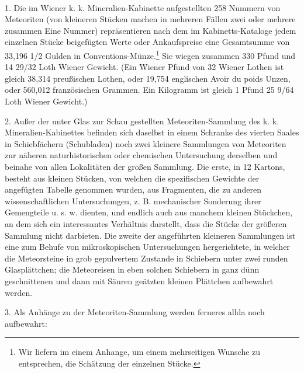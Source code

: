 \documentclass[a4paper, 11pt, oneside, polutonikogreek, german]{article}
\begin{document}
\paragraph{}
1. Die im Wiener k. k. Mineralien-Kabinette aufgestellten 258 Nummern von Meteoriten (von kleineren Stücken machen in mehreren Fällen zwei oder mehrere zusammen Eine Nummer) repräsentieren nach dem im Kabinetts-Kataloge jedem einzelnen Stücke beigefügten Werte oder Ankaufspreise eine Gesamtsumme von 33,196 1/2 Gulden in Conventions-Münze.\footnote{Wir liefern im einem Anhange, um einem mehrseitigen Wunsche zu entsprechen, die Schätzung der einzelnen Stücke.} Sie wiegen zusammen 330 Pfund und 14 29/32 Loth Wiener Gewicht. (Ein Wiener Pfund von 32 Wiener Lothen ist gleich 38,314 preußischen Lothen, oder 19,754 englischen Avoir du poids Unzen, oder 560,012 französischen Grammen. Ein Kilogramm ist gleich 1 Pfund 25 9/64 Loth Wiener Gewicht.)

2. Außer der unter Glas zur Schau gestellten Meteoriten-Sammlung des k. k. Mineralien-Kabinettes befinden sich daselbst in einem Schranke des vierten Saales in Schiebfächern (Schubladen) noch zwei kleinere Sammlungen von Meteoriten zur näheren naturhistorischen oder chemischen Untersuchung derselben und beinahe von allen Lokalitäten der großen Sammlung. Die erste, in 12 Kartons, besteht aus kleinen Stücken, von welchen die spezifischen Gewichte der angefügten Tabelle genommen wurden, aus Fragmenten, die zu anderen wissenschaftlichen Untersuchungen, z. B. mechanischer Sonderung ihrer Gemengteile u. s. w. dienten, und endlich auch aus manchem kleinen Stückchen, an dem sich ein interessantes Verhältnis darstellt, dass die Stücke der größeren Sammlung nicht darbieten. Die zweite der angeführten kleineren Sammlungen ist eine zum Behufe von mikroskopischen Untersuchungen hergerichtete, in welcher die Meteorsteine in grob gepulvertem Zustande in Schiebern unter zwei runden Glasplättchen; die Meteoreisen in eben solchen Schiebern in ganz dünn geschnittenen und dann mit Säuren geätzten kleinen Plättchen aufbewahrt werden.

3. Als Anhänge zu der Meteoriten-Sammlung werden ferneres allda noch aufbewahrt:
\end{document}
